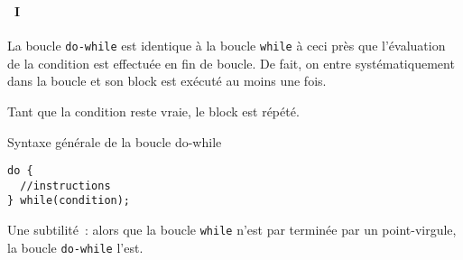 \begin{frame}[containsverbatim]
  \frametitle{\secname}
  \framesubtitle{\subsecname~I}

  La boucle \verb|do-while| est identique à la boucle \verb|while| à ceci près que l'évaluation de la condition est effectuée en fin de boucle. De fait, on entre
  systématiquement dans la boucle et son block est exécuté au moins une fois.
  \par
  Tant que la condition reste vraie, le block est répété.
  \begin{block}{Syntaxe générale de la boucle do-while}
    \begin{verbatim}
do {
  //instructions
} while(condition);\end{verbatim}
  \end{block}
  \par
  Une subtilité~: alors que la boucle \verb|while| n'est par terminée par un point-virgule, la boucle \verb|do-while| l'est.
\end{frame}

